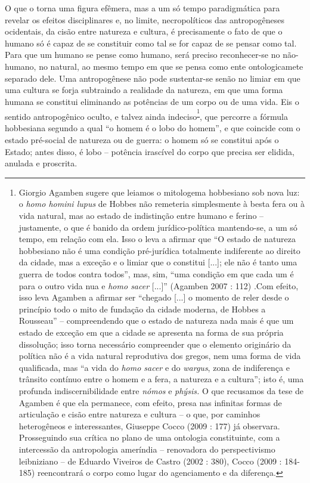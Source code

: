 O que o torna uma figura efêmera, mas a um só tempo paradigmática para
revelar os efeitos disciplinares e, no limite, necropolíticos das
antropogêneses ocidentais, da cisão entre natureza e cultura, é
precisamente o fato de que o humano só é capaz de se constituir como tal
se for capaz de se pensar como tal. Para que um humano se pense como
humano, será preciso reconhecer-se no não-humano, no natural, ao mesmo
tempo em que se pensa como ente ontologicamete separado dele. Uma
antropogênese não pode sustentar-se senão no limiar em que uma cultura
se forja subtraindo a realidade da natureza, em que uma forma humana se
constitui eliminando as potências de um corpo ou de uma vida. Eis o
sentido antropogênico oculto, e talvez ainda
indeciso\textsuperscript{\footnote{Giorgio Agamben sugere que leiamos o
  mitologema hobbesiano sob nova luz: o \emph{homo homini lupus} de
  Hobbes não remeteria simplesmente à besta fera ou à vida natural, mas
  ao estado de indistinção entre humano e ferino -- justamente, o que é
  banido da ordem jurídico-política mantendo-se, a um só tempo, em
  relação com ela. Isso o leva a afirmar que ``O estado de natureza
  hobbesiano não é uma condição pré-jurídica totalmente indiferente ao
  direito da cidade, mas a exceção e o limiar que o constitui {[}...{]};
  ele não é tanto uma guerra de todos contra todos'', mas, sim, ``uma
  condição em que cada um é para o outro vida nua e \emph{homo sacer
  }{[}...{]}'' (Agamben 2007 : 112) .Com efeito, isso leva Agamben a
  afirmar ser ``chegado {[}...{]} o momento de reler desde o princípio
  todo o mito de fundação da cidade moderna, de Hobbes a Rousseau'' --
  compreendendo que o estado de natureza nada mais é que um estado de
  exceção em que a cidade se apresenta na forma de sua própria
  dissolução; isso torna necessário compreender que o elemento
  originário da política não é a vida natural reprodutiva dos gregos,
  nem uma forma de vida qualificada, mas ``a vida do \emph{homo sacer} e
  do \emph{wargus}, zona de indiferença e trânsito contínuo entre o
  homem e a fera, a natureza e a cultura''; isto é, uma profunda
  indiscernibilidade entre \emph{nómos }e \emph{phýsis. }O que recusamos
  da tese de Agamben é que ela permanece, com efeito, presa nas
  infinitas formas de articulação e cisão entre natureza e cultura -- o
  que, por caminhos heterogêneos e interessantes, Giuseppe Cocco (2009 :
  177) já observara. Prosseguindo sua crítica no plano de uma ontologia
  constituinte, com a intercessão da antropologia ameríndia --
  renovadora do perspectivismo leibniziano -- de Eduardo Viveiros de
  Castro (2002 : 380), Cocco (2009 : 184-185) reencontrará o corpo como
  lugar do agenciamento e da diferença. }}, que percorre a fórmula
hobbesiana segundo a qual ``o homem é o lobo do homem'', e que coincide
com o estado pré-social de natureza ou de guerra: o homem só se
constitui após o Estado; antes disso, é lobo -- potência irascível do
corpo que precisa ser elidida, anulada e proscrita.

